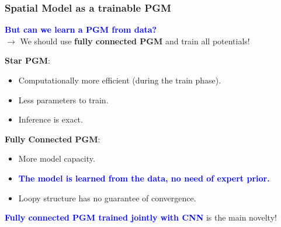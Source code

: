 \documentclass{beamer}
\newcommand\blue[1]{\textcolor{blue}{\textbf{#1}}}
\begin{document}
    
    \begin{frame}[t]
    	\frametitle{Spatial Model as a trainable PGM}
    	\begin{center}
    		\blue{But can we learn a PGM from data?} \\
    		$\rightarrow$ We should use \textbf{fully connected PGM} and train all potentials!
    		
    	\end{center}
    	
    	\begin{flushleft}
    		\textbf{Star PGM}:\\
    		\begin{itemize}
    			\item Computationally more efficient (during the train phase).\\
    			\item Less parameters to train.\\
    			\item Inference is exact.\\
    		\end{itemize}
    		\textbf{Fully Connected PGM}:\\
    		\begin{itemize}
    			\item More model capacity.\\
    			\item \blue{The model is learned from the data, no need of expert prior.}\\
    			\item Loopy structure has no guarantee of convergence.
    		\end{itemize}
    		
    		\blue{Fully connected PGM trained jointly with CNN} is the main novelty!
    	\end{flushleft}
    \end{frame}
    
   
    
\end{document}
